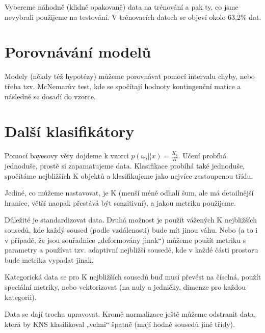 \documentclass[12pt]{article}					%
\begin{document}
    \begin{definice}[Bootstrap]
        Vybereme náhodně (klidně opakovaně) data na trénování a pak ty, co jsme nevybrali použijeme na testování. V trénovacích datech se objeví okolo 63,2\% dat.
    \end{definice}

\section{Porovnávání modelů}
    \begin{definice}[Porovnávání]
        Modely (někdy též hypotézy) můžeme porovnávat pomocí intervalu chyby, nebo třeba tzv. McNemarův test, kde se spočítají hodnoty kontingenční matice a následně se dosadí do vzorce.
    \end{definice}

\section{Další klasifikátory}
    \begin{definice}
        Pomocí bayesovy věty dojdeme k vzorci $p(\omega_i|¦x) = \frac{K_i}{K}$. Učení probíhá jednoduše, prostě si zapamatujeme data. Klasifikace probíhá také jednoduše, spočítáme nejbližších K objektů a klasifikujeme jako nejvíce zastoupenou třídu.

        Jediné, co můžeme nastavovat, je K (menší méně odhalí šum, ale má detailnější hranice, větší naopak přestává být senzitivní), a jakou metriku použijeme.

        Důležité je standardizovat data. Druhá možnost je použít vážených K nejbližších sousedů, kde každý soused (podle vzdálenosti) bude mít jinou váhu. Nebo (a to i v případě, že jsou souřadnice „deformovány jinak“) můžeme použít metriku s parametry a používat tzv. adaptivní nejbližší sousedé, kde v každé části prostoru bude metrika vypadat jinak.

        Kategorická data se pro K nejbližších sousedů buď musí převést na číselná, použít speciální metriky, nebo vektorizovat (na nuly a jedničky, dimenze pro každou kategorii).

        Data se dají trochu upravovat. Kromě normalizace ještě můžeme odstranit data, která by KNS klasifikoval „velmi“ špatně (mají hodně sousedů jiné třídy).
    \end{definice}

\end{document}

